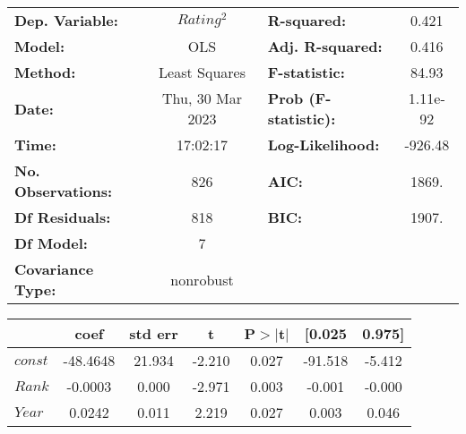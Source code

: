     \begin{table}[H]
        \begin{center}
            \begin{tabular}{lclc}
                \toprule
                \textbf{Dep. Variable:}            &     $Rating^2$     & \textbf{  R-squared:         } &     0.421   \\
                \textbf{Model:}                    &       OLS        & \textbf{  Adj. R-squared:    } &     0.416   \\
                \textbf{Method:}                   &  Least Squares   & \textbf{  F-statistic:       } &     84.93   \\
                \textbf{Date:}                     & Thu, 30 Mar 2023 & \textbf{  Prob (F-statistic):} &  1.11e-92   \\
                \textbf{Time:}                     &     17:02:17     & \textbf{  Log-Likelihood:    } &   -926.48   \\
                \textbf{No. Observations:}         &         826      & \textbf{  AIC:               } &     1869.   \\
                \textbf{Df Residuals:}             &         818      & \textbf{  BIC:               } &     1907.   \\
                \textbf{Df Model:}                 &           7      & \textbf{                     } &             \\
                \textbf{Covariance Type:}          &    nonrobust     & \textbf{                     } &             \\
                \bottomrule
            \end{tabular}
            \begin{tabular}{lcccccc}
                                                & \textbf{coef} & \textbf{std err} & \textbf{t} & \textbf{P$> |$t$|$} & \textbf{[0.025} & \textbf{0.975]}  \\
                \midrule
                \textbf{$const$}                 &     -48.4648  &       21.934     &    -2.210  &         0.027        &      -91.518    &       -5.412     \\
                \textbf{$Rank$}                  &      -0.0003  &        0.000     &    -2.971  &         0.003        &       -0.001    &       -0.000     \\
                \textbf{$Year$}                  &       0.0242  &        0.011     &     2.219  &         0.027        &        0.003    &        0.046     \\

\end{tabular}
\end{center}
\end{table}
